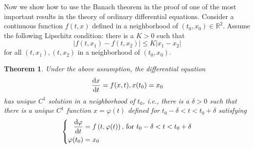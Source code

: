 \documentclass[12pt,leqno]{amsart}
\newtheorem{theorem}{Theorem}[section]
\theoremstyle{definition}
\numberwithin{equation}{subsection}
\begin{document}
Now we show how to use the Banach theorem in the proof of one of the most important results in the theory of ordinary differential equations. Consider a continuous function $f(t,x)$ defined in a neighborhood of $(t_0,x_0)\in\mathbb{R}^2$. Assume the following Lipschitz condition: there is a $K > 0$ such that 
$$\left|f(t,x_1) - f(t,x_2)\right| \leq K \left|x_1 - x_2\right|$$
for all $(t,x_1), (t,x_2)$ in a neighborhood of $(t_0,x_0)$.
\begin{theorem}
Under the above assumption, the differential equation 
\begin{equation}\label{equ_5}
    \dv{x}{t} = f(x,t), x(t_0) = x_0
\end{equation}
has unique $C^1$ solution in a neighborhood of $t_0$, i.e., there is a $\delta > 0$ such that there is a unique $C^1$ function $x = \varphi(t)$ defined for $t_0 - \delta < t < t_0 + \delta$ satisfying 
\begin{align*}
    \left\{
    \begin{aligned}
        \dv{\varphi}{t} & = f\left(t,\varphi(t)\right),\, {\rm for}\,\, t_0 - \delta < t < t_0 + \delta\\
        \varphi(t_0) & = x_0
    \end{aligned}
    \right.
\end{align*}
\end{theorem}
\end{document}
